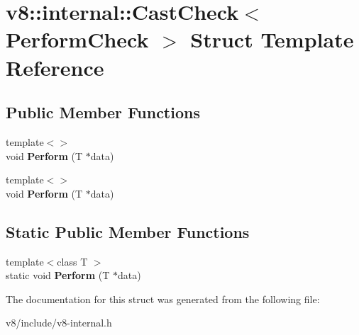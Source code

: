 \hypertarget{structv8_1_1internal_1_1CastCheck}{}\section{v8\+:\+:internal\+:\+:Cast\+Check$<$ Perform\+Check $>$ Struct Template Reference}
\label{structv8_1_1internal_1_1CastCheck}
\subsection*{Public Member Functions}
\begin{DoxyCompactItemize}
\item 
\mbox{\label{structv8_1_1internal_1_1CastCheck_a0a213344d48ca226529f7ebd6edd6f3e}} 
{\footnotesize template$<$$>$ }\\void {\bfseries Perform} (T $\ast$data)
\item 
\mbox{\label{structv8_1_1internal_1_1CastCheck_ab169a4db19476037fa7f64bb2f5b1ccf}} 
{\footnotesize template$<$$>$ }\\void {\bfseries Perform} (T $\ast$data)
\end{DoxyCompactItemize}
\subsection*{Static Public Member Functions}
\begin{DoxyCompactItemize}
\item 
\mbox{\label{structv8_1_1internal_1_1CastCheck_a79edb0718f67826a1c2c1eba5a5a9bf5}} 
{\footnotesize template$<$class T $>$ }\\static void {\bfseries Perform} (T $\ast$data)
\end{DoxyCompactItemize}


The documentation for this struct was generated from the following file\+:\begin{DoxyCompactItemize}
\item 
v8/include/v8-\/internal.\+h\end{DoxyCompactItemize}
